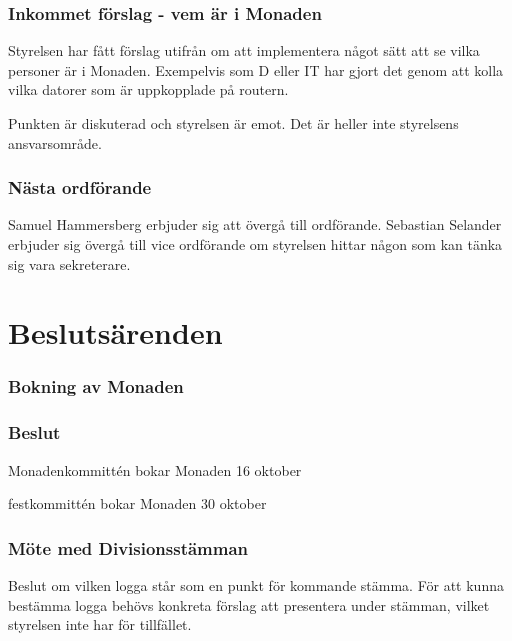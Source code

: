 \documentclass[protokoll]{dvd}
\begin{document}
\subsubsection{Inkommet förslag - vem är i Monaden}

Styrelsen har fått förslag utifrån om att implementera något sätt att se vilka personer är i Monaden. Exempelvis som D eller IT har gjort det genom att kolla vilka datorer som är uppkopplade på routern.

Punkten är diskuterad och styrelsen är emot. Det är heller inte styrelsens ansvarsområde.


\subsubsection{Nästa ordförande}

Samuel Hammersberg erbjuder sig att övergå till ordförande. Sebastian Selander erbjuder sig övergå till vice ordförande om styrelsen hittar någon som kan tänka sig vara sekreterare.

\newpage







\section{Beslutsärenden}

\subsubsection{Bokning av Monaden}

\subsubsection*{Beslut}
\begin{attsatser}
    \item Monadenkommittén bokar Monaden 16 oktober
    \item festkommittén bokar Monaden 30 oktober
\end{attsatser}

\subsubsection{Möte med Divisionsstämman}

Beslut om vilken logga står som en punkt för kommande stämma. 
För att kunna bestämma logga behövs konkreta förslag att presentera under stämman, vilket styrelsen inte har för tillfället.
\end{document}
